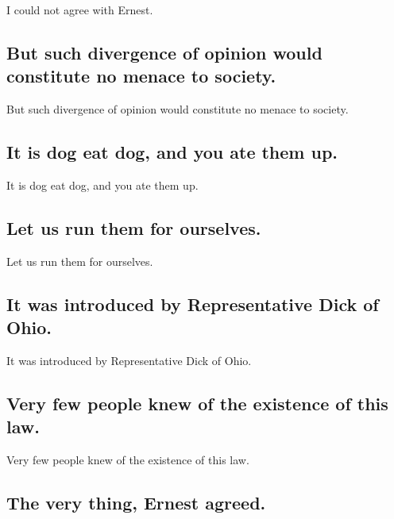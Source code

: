 \documentclass[]{article}
\begin{document}
I could not agree with Ernest.

\hypertarget{but-such-divergence-of-opinion-would-constitute-no-menace-to-society.}{%
\subsection{But such divergence of opinion would constitute no menace to
society.}\label{but-such-divergence-of-opinion-would-constitute-no-menace-to-society.}}

But such divergence of opinion would constitute no menace to society.

\hypertarget{it-is-dog-eat-dog-and-you-ate-them-up.}{%
\subsection{It is dog eat dog, and you ate them
up.}\label{it-is-dog-eat-dog-and-you-ate-them-up.}}

It is dog eat dog, and you ate them up.

\hypertarget{let-us-run-them-for-ourselves.}{%
\subsection{Let us run them for
ourselves.}\label{let-us-run-them-for-ourselves.}}

Let us run them for ourselves.

\hypertarget{it-was-introduced-by-representative-dick-of-ohio.}{%
\subsection{It was introduced by Representative Dick of
Ohio.}\label{it-was-introduced-by-representative-dick-of-ohio.}}

It was introduced by Representative Dick of Ohio.

\hypertarget{very-few-people-knew-of-the-existence-of-this-law.}{%
\subsection{Very few people knew of the existence of this
law.}\label{very-few-people-knew-of-the-existence-of-this-law.}}

Very few people knew of the existence of this law.

\hypertarget{the-very-thing-ernest-agreed.}{%
\subsection{The very thing, Ernest
agreed.}\label{the-very-thing-ernest-agreed.}}
\end{document}
